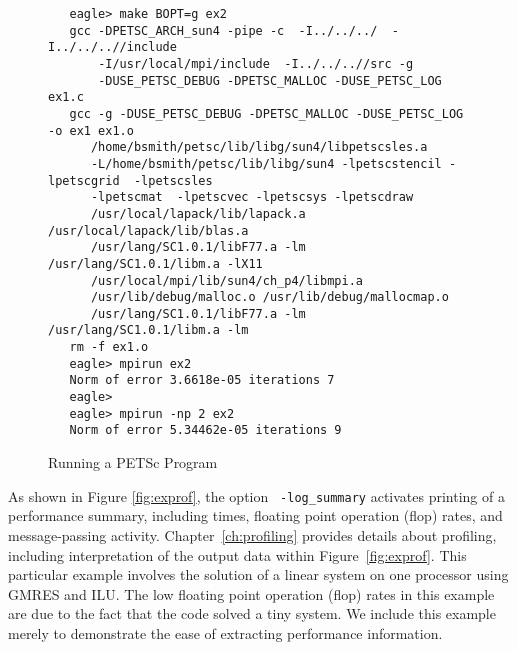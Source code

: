 \begin{figure}[H]
{\small
\begin{verbatim}
   eagle> make BOPT=g ex2
   gcc -DPETSC_ARCH_sun4 -pipe -c  -I../../../  -I../../..//include   
       -I/usr/local/mpi/include  -I../../..//src -g 
       -DUSE_PETSC_DEBUG -DPETSC_MALLOC -DUSE_PETSC_LOG ex1.c
   gcc -g -DUSE_PETSC_DEBUG -DPETSC_MALLOC -DUSE_PETSC_LOG -o ex1 ex1.o 
      /home/bsmith/petsc/lib/libg/sun4/libpetscsles.a 
      -L/home/bsmith/petsc/lib/libg/sun4 -lpetscstencil -lpetscgrid  -lpetscsles 
      -lpetscmat  -lpetscvec -lpetscsys -lpetscdraw  
      /usr/local/lapack/lib/lapack.a /usr/local/lapack/lib/blas.a 
      /usr/lang/SC1.0.1/libF77.a -lm /usr/lang/SC1.0.1/libm.a -lX11 
      /usr/local/mpi/lib/sun4/ch_p4/libmpi.a
      /usr/lib/debug/malloc.o /usr/lib/debug/mallocmap.o  
      /usr/lang/SC1.0.1/libF77.a -lm /usr/lang/SC1.0.1/libm.a -lm
   rm -f ex1.o
   eagle> mpirun ex2
   Norm of error 3.6618e-05 iterations 7
   eagle>
   eagle> mpirun -np 2 ex2
   Norm of error 5.34462e-05 iterations 9
\end{verbatim}
}
\nobreak
\caption{Running a PETSc Program}
\label{fig:exrun}
\end{figure}

As shown in Figure \ref{fig:exprof}, the option {\tt
-log\_summary} activates printing of a performance summary, including
times, floating point operation (flop) rates, and message-passing
activity.  Chapter~\ref{ch:profiling}
provides details about profiling, including interpretation of the
output data within Figure~\ref{fig:exprof}.  This particular example involves the solution of a linear
system on one processor using GMRES and ILU.  The low floating point
operation (flop) rates in this example are due to the fact that the
code solved a tiny system.  We include this example merely to
demonstrate the ease of extracting performance information.

